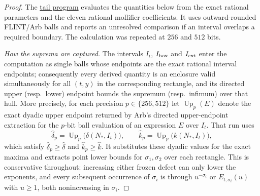 \documentclass[11pt]{article}
\theoremstyle{definition}
\newcommand{\programlink}[2]{\href{https://github.com/judegomila/dbn-lambda-01787854-candidate-audit/blob/6222740efae58d773a70ff929cf12a34932d2af0/#1}{#2}}
\begin{document}
\begin{proof}
The \programlink{dan-reworking/code/prop510/prop510_proof.c}{tail program}
evaluates the
quantities below from the exact rational parameters and the eleven rational
mollifier coefficients.  It uses outward-rounded FLINT/Arb balls and reports
an unresolved comparison if an interval overlaps a required boundary.  The
calculation was repeated at $256$ and $512$ bits.

\emph{How the suprema are captured.} The intervals $I_t$,
$I_{\rm box}$ and $I_{\rm ext}$ enter the computation as single
balls whose endpoints are the exact rational interval endpoints;
consequently every derived quantity is an enclosure valid
simultaneously for all $(t,y)$ in the corresponding rectangle, and its
directed upper (resp.\ lower) endpoint bounds the supremum (resp.\
infimum) over that hull. More precisely, for each precision
$p\in\{256,512\}$ let $\operatorname{Up}_p(E)$ denote the exact dyadic
upper endpoint returned by Arb's directed upper-endpoint extraction for
the $p$-bit ball evaluation of an expression $E$ over $I_t$.  That run
uses
\[
\widehat\delta_p=\operatorname{Up}_p\bigl(\delta(N_*,I_t)\bigr),
\qquad
\widehat k_p=\operatorname{Up}_p\bigl(k(N_*,I_t)\bigr),
\]
which satisfy $\widehat\delta_p\ge\widehat\delta$ and
$\widehat k_p\ge\widehat k$.  It substitutes these dyadic values for
the exact maxima and extracts point lower bounds for
$\sigma_1,\sigma_2$ over each rectangle. This is conservative throughout:
increasing either frozen defect can only lower the exponents, and every
subsequent occurrence of $\sigma_i$ is through $u^{-\sigma_i}$ or
$E_{t,\sigma_i}(u)$ with $u\ge1$, both nonincreasing in $\sigma_i$.


\end{proof}
\end{document}

